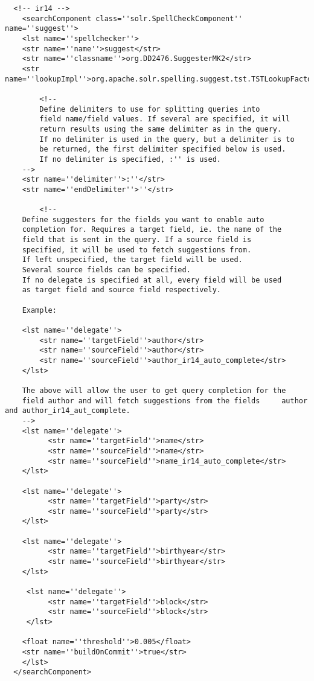 \begin{verbatim}
  <!-- ir14 -->
    <searchComponent class=''solr.SpellCheckComponent'' name=''suggest''>
    <lst name=''spellchecker''>
    <str name=''name''>suggest</str>
    <str name=''classname''>org.DD2476.SuggesterMK2</str>
    <str name=''lookupImpl''>org.apache.solr.spelling.suggest.tst.TSTLookupFactory</str>

        <!--
        Define delimiters to use for splitting queries into
        field name/field values. If several are specified, it will
        return results using the same delimiter as in the query.
        If no delimiter is used in the query, but a delimiter is to
        be returned, the first delimiter specified below is used.
        If no delimiter is specified, :'' is used.
    -->
    <str name=''delimiter''>:''</str>
    <str name=''endDelimiter''>''</str>

        <!--
    Define suggesters for the fields you want to enable auto
    completion for. Requires a target field, ie. the name of the
    field that is sent in the query. If a source field is
    specified, it will be used to fetch suggestions from.
    If left unspecified, the target field will be used.
    Several source fields can be specified.
    If no delegate is specified at all, every field will be used
    as target field and source field respectively.

    Example:

    <lst name=''delegate''>
        <str name=''targetField''>author</str>
        <str name=''sourceField''>author</str>
        <str name=''sourceField''>author_ir14_auto_complete</str>
    </lst>

    The above will allow the user to get query completion for the 
    field author and will fetch suggestions from the fields     author and author_ir14_aut_complete.
    -->
    <lst name=''delegate''>
          <str name=''targetField''>name</str>
          <str name=''sourceField''>name</str>
          <str name=''sourceField''>name_ir14_auto_complete</str>
    </lst>

    <lst name=''delegate''>
          <str name=''targetField''>party</str>
          <str name=''sourceField''>party</str>
    </lst>

    <lst name=''delegate''>
          <str name=''targetField''>birthyear</str>
          <str name=''sourceField''>birthyear</str>
    </lst>

     <lst name=''delegate''>
          <str name=''targetField''>block</str>
          <str name=''sourceField''>block</str>
     </lst>
     
    <float name=''threshold''>0.005</float>
    <str name=''buildOnCommit''>true</str>
    </lst>
  </searchComponent>
\end{verbatim}


